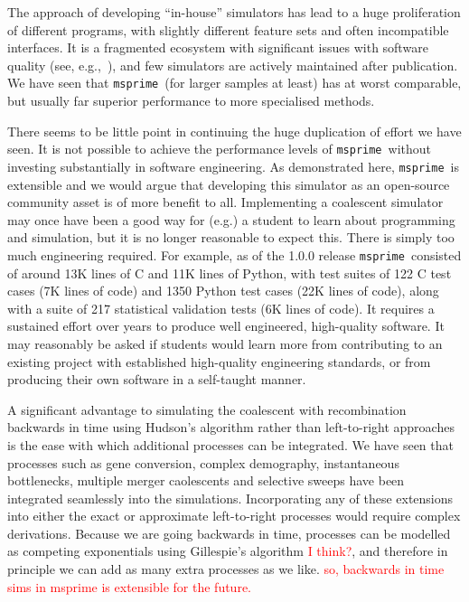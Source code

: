 \documentclass{article}
\newcommand{\msprime}[0]{\texttt{msprime}}
\newcommand{\jkcomment}[1]{\textcolor{red}{#1}}
\begin{document}
The approach of developing ``in-house'' simulators
has lead to a huge proliferation of different programs, with
slightly different feature sets and often incompatible interfaces.
It is a fragmented ecosystem with significant issues with software
quality (see, e.g.,~\cite{yang2014critical}),
and few simulators are actively maintained after publication.
We have seen that \msprime\ (for larger samples at least)
has at worst comparable, but usually far superior
performance to more specialised methods.


There seems to be little point in continuing the huge duplication of effort we
have seen. It is not possible to achieve the performance levels of \msprime\
without investing substantially in software engineering. As demonstrated here,
\msprime\ is extensible and we would argue that developing this simulator as an
open-source community asset is of more benefit to all. Implementing a
coalescent simulator may once have been a good way for (e.g.) a student to
learn about programming and simulation, but it is no longer reasonable to
expect this. There is simply too much engineering required. For example, as of
the 1.0.0 release \msprime\ consisted of around 13K lines of C and 11K
lines of Python, with test suites of 122 C test cases (7K lines of code) and
1350 Python test cases (22K lines of code), along with a suite of 217
statistical validation tests (6K lines of code). It requires a sustained effort
over years to produce well engineered, high-quality software. It may reasonably
be asked if students would learn more from contributing to an existing project
with established high-quality engineering standards, or from producing their own
software in a self-taught manner.

A significant advantage to simulating the coalescent with recombination
backwards in time using Hudson's algorithm rather than
left-to-right
approaches~\citep{wiuf1999recombination,chen2009fast,staab2015scrm}
is the ease with which additional processes can be integrated.
We have seen that processes such as gene conversion, complex
demography, instantaneous bottlenecks, multiple merger caolescents
and selective sweeps have been integrated seamlessly into
the simulations. Incorporating any of these extensions into
either the exact or approximate left-to-right processes would require
complex derivations. Because we are going backwards
in time, processes can be modelled as competing exponentials
using Gillespie's algorithm \jkcomment{I think?},
and therefore in principle we can
add as many extra processes as we like.
\jkcomment{so, backwards in time
sims in msprime is extensible for the future.}
\end{document}
